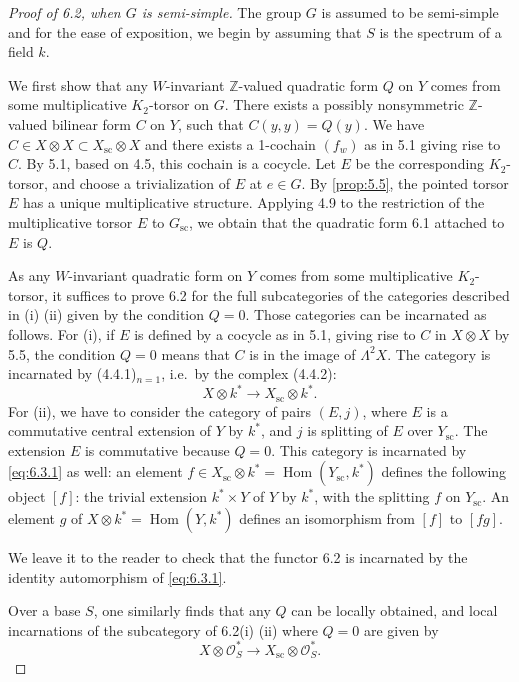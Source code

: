 \documentclass[11pt,a4paper]{article}
\theoremstyle{plain}
\theoremstyle{definition}
\DeclareMathOperator{\Hom}{Hom}
\newcommand{\cO}{\mathcal{O}}
\newcommand{\bZ}{\mathbb{Z}}
\newcommand{\scu}{\mathrm{sc}}
\begin{document}
\begin{proof}[Proof of 6.2, when $G$ is semi-simple]
The group $G$ is assumed to be semi-simple and for the ease of exposition, we begin by assuming that $S$ is the spectrum of a field $k$.

We first show that any $W$-invariant $\bZ$-valued quadratic form $Q$ on $Y$ comes from some multiplicative $K_2$-torsor on $G$. There exists a possibly nonsymmetric $\bZ$-valued bilinear form $C$ on $Y$, such that $C(y,y) = Q(y)$. We have $C \in X \otimes X \subset X_\scu \otimes X$ and there exists a 1-cochain $(f_w)$ as in 5.1 giving rise to $C$. By 5.1, based on 4.5, this cochain is a cocycle. Let $E$ be the corresponding $K_2$-torsor, and choose a trivialization of $E$ at $e \in G$. By \ref{prop:5.5}, the pointed torsor $E$ has a unique multiplicative structure. Applying 4.9 to the restriction of the multiplicative torsor $E$ to $G_\scu$, we obtain that the quadratic form 6.1 attached to $E$ is $Q$.

As any $W$-invariant quadratic form on $Y$ comes from some multiplicative $K_2$-torsor, it suffices to prove 6.2 for the full subcategories of the categories described in (i) (ii) given by the condition $Q = 0$. Those categories can be incarnated as follows. For (i), if $E$ is defined by a cocycle as in 5.1, giving rise to $C$ in $X \otimes X$ by 5.5, the condition $Q=0$ means that $C$ is in the image of $\Lambda^2 X$. The category is incarnated by (4.4.1)$_{n=1}$, i.e.~by the complex (4.4.2):
\begin{equation}\label{eq:6.3.1}
X \otimes k^* \to X_\scu \otimes k^*.
\end{equation}
For (ii), we have to consider the category of pairs $(E, j)$, where $E$ is a commutative central extension of $Y$ by $k^*$, and $j$ is splitting of $E$ over $Y_\scu$. The extension $E$ is commutative because $Q=0$. This category is incarnated by \eqref{eq:6.3.1} as well: an element $f \in X_\scu \otimes k^* = \Hom(Y_\scu, k^*)$ defines the following object $[f]$: the trivial extension $k^* \times Y$ of $Y$ by $k^*$, with the splitting $f$ on $Y_\scu$. An element $g$ of $X \otimes k^* = \Hom(Y, k^*)$ defines an isomorphism from $[f]$ to $[fg]$.

We leave it to the reader to check that the functor 6.2 is incarnated by the identity automorphism of \eqref{eq:6.3.1}.

Over a base $S$, one similarly finds that any $Q$ can be locally obtained, and local incarnations of the subcategory of 6.2(i) (ii) where $Q=0$ are given by
\begin{equation}\label{eq:6.3.2}
X \otimes \cO^*_S \to X_\scu \otimes \cO^*_S.
\end{equation}
\end{proof}
\end{document}
